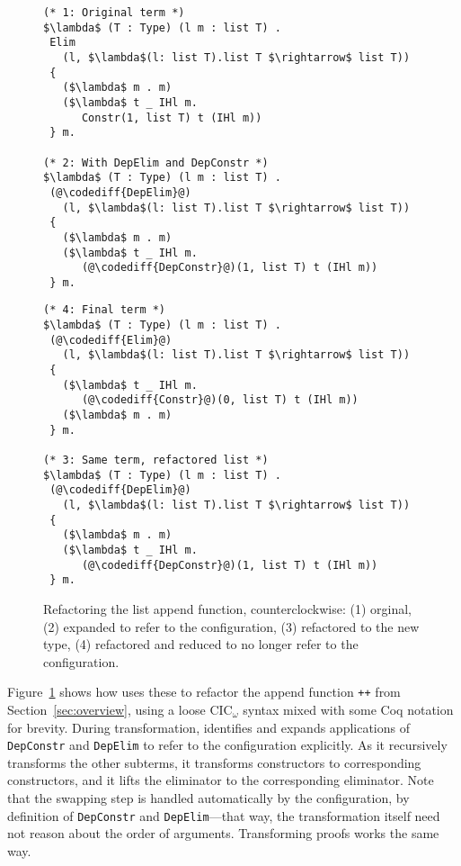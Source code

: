 \begin{figure}
\begin{minipage}{0.48\textwidth}
\begin{lstlisting}
(* 1: Original term *)
$\lambda$ (T : Type) (l m : list T) .
 Elim
   (l, $\lambda$(l: list T).list T $\rightarrow$ list T))
 {
   ($\lambda$ m . m)
   ($\lambda$ t _ IHl m.
      Constr(1, list T) t (IHl m))
 } m.
 
(* 2: With DepElim and DepConstr *)
$\lambda$ (T : Type) (l m : list T) .
 (@\codediff{DepElim}@)
   (l, $\lambda$(l: list T).list T $\rightarrow$ list T))
 {
   ($\lambda$ m . m)
   ($\lambda$ t _ IHl m.
      (@\codediff{DepConstr}@)(1, list T) t (IHl m))
 } m.
\end{lstlisting}
\end{minipage}
\hfill
\begin{minipage}{0.48\textwidth}
\begin{lstlisting}
(* 4: Final term *)
$\lambda$ (T : Type) (l m : list T) .
 (@\codediff{Elim}@)
   (l, $\lambda$(l: list T).list T $\rightarrow$ list T))
 {
   ($\lambda$ t _ IHl m.
      (@\codediff{Constr}@)(0, list T) t (IHl m))
   ($\lambda$ m . m)
 } m.

(* 3: Same term, refactored list *)
$\lambda$ (T : Type) (l m : list T) .
 (@\codediff{DepElim}@)
   (l, $\lambda$(l: list T).list T $\rightarrow$ list T))
 {
   ($\lambda$ m . m)
   ($\lambda$ t _ IHl m.
      (@\codediff{DepConstr}@)(1, list T) t (IHl m))
 } m.
\end{lstlisting}
\end{minipage}
\caption{Refactoring the list append function, counterclockwise: (1) orginal, (2) expanded to refer to the configuration, (3) refactored to the new type, (4) refactored and reduced to no longer refer to the configuration.}
\label{fig:appswap2}
\end{figure}

Figure~\ref{fig:appswap2} shows how \toolname uses these to refactor the append function \lstinline{++}
from Section~\ref{sec:overview}, using a loose CIC$_{\omega}$ syntax mixed with some Coq notation for brevity.
During transformation, \toolname identifies and expands applications of \lstinline{DepConstr} and \lstinline{DepElim}
to refer to the configuration explicitly.
As it recursively transforms the other subterms, it transforms constructors to corresponding constructors,
and it lifts the eliminator to the corresponding eliminator.
Note that the swapping step is handled automatically by the configuration, by definition of \lstinline{DepConstr}
and \lstinline{DepElim}---that way, the transformation itself need not reason about the order of arguments.
Transforming proofs works the same way.

